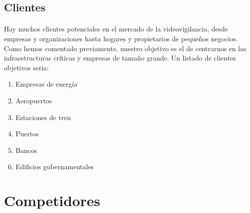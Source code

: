 \documentclass{report}
\begin{document}
        \subsection*{Clientes}
          \paragraph*{}{
            Hay muchos clientes potenciales en el mercado de la videovigilancia, desde empresas y organizaciones hasta hogares y propietarios de pequeños negocios.
            Como hemos comentado previamente, nuestro objetivo es el de centrarnos en las infraestructuras críticas y empresas de tamaño grande.
            Un listado de clientes objetivos seria:
          }
          \begin{multicols}{2}
            \begin{enumerate}
              \item Empresas de energía
              \item Aeropuertos
              \item Estaciones de tren
              \item Puertos
              \item Bancos
              \item Edificios gubernamentales
            \end{enumerate}
          \end{multicols}
      \clearpage\section{Competidores}
\end{document}
